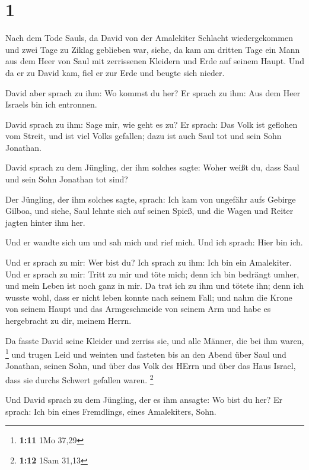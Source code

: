 \hypertarget{section}{%
\section{1}\label{section}}

 Nach dem Tode Sauls, da David von der Amalekiter Schlacht
wiedergekommen und zwei Tage zu Ziklag geblieben war, 
siehe, da kam am dritten Tage ein Mann aus dem Heer von Saul mit
zerrissenen Kleidern und Erde auf seinem Haupt. Und da er zu David kam,
fiel er zur Erde und beugte sich nieder.

 David aber sprach zu ihm: Wo kommst du her? Er sprach zu
ihm: Aus dem Heer Israels bin ich entronnen.

 David sprach zu ihm: Sage mir, wie geht es zu? Er sprach:
Das Volk ist geflohen vom Streit, und ist viel Volks gefallen; dazu ist
auch Saul tot und sein Sohn Jonathan.

 David sprach zu dem Jüngling, der ihm solches sagte: Woher
weißt du, dass Saul und sein Sohn Jonathan tot sind?

 Der Jüngling, der ihm solches sagte, sprach: Ich kam von
ungefähr aufs Gebirge Gilboa, und siehe, Saul lehnte sich auf seinen
Spieß, und die Wagen und Reiter jagten hinter ihm her.

 Und er wandte sich um und sah mich und rief mich. Und ich
sprach: Hier bin ich.

 Und er sprach zu mir: Wer bist du? Ich sprach zu ihm: Ich
bin ein Amalekiter.  Und er sprach zu mir: Tritt zu mir und
töte mich; denn ich bin bedrängt umher, und mein Leben ist noch ganz in
mir.  Da trat ich zu ihm und tötete ihn; denn ich wusste
wohl, dass er nicht leben konnte nach seinem Fall; und nahm die Krone
von seinem Haupt und das Armgeschmeide von seinem Arm und habe es
hergebracht zu dir, meinem Herrn.

 Da fasste David seine Kleider und zerriss sie, und alle
Männer, die bei ihm waren, \footnote{\textbf{1:11} 1Mo 37,29}
 und trugen Leid und weinten und fasteten bis an den Abend
über Saul und Jonathan, seinen Sohn, und über das Volk des HErrn und
über das Haus Israel, dass sie durchs Schwert gefallen waren.
\footnote{\textbf{1:12} 1Sam 31,13}

 Und David sprach zu dem Jüngling, der es ihm ansagte: Wo
bist du her? Er sprach: Ich bin eines Fremdlings, eines Amalekiters,
Sohn.

